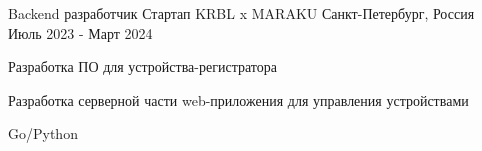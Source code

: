 

\begin{cventries}

  \cventry
    {Backend разработчик} %
    {Стартап KRBL x MARAKU} %
    {Санкт-Петербург, Россия} %
    {Июль 2023 - Март 2024} %
    {
      \begin{cvitems} %
        \item {Разработка ПО для устройства-регистратора}
        \item {Разработка серверной части web-приложения для управления устройствами}
        \item {Go/Python}
      \end{cvitems}
    }

\end{cventries}
